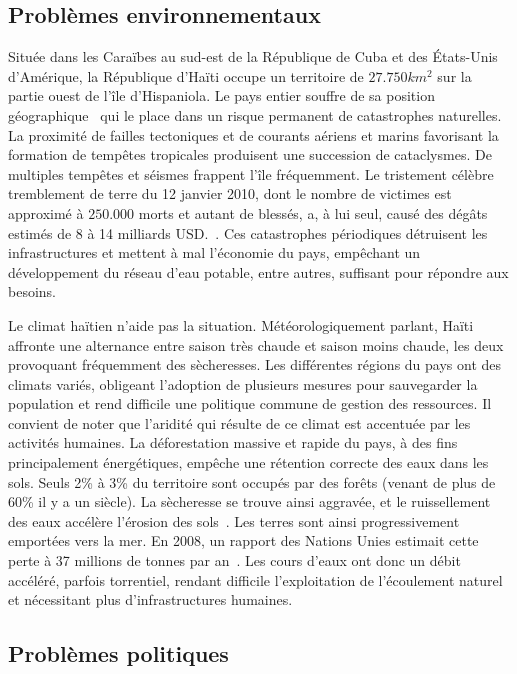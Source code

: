 \documentclass{eplmastersthesis_FR}
\begin{document}
			\subsection*{Problèmes environnementaux}
				Située dans les Caraïbes au sud-est de la République de Cuba et des \'Etats-Unis d'Amérique, la République d'Haïti occupe un territoire de $27.750km^{2}$ sur la partie ouest de l'île d'Hispaniola. Le pays entier souffre de sa position géographique~\cite{ref:regards_situation_eau_haiti} qui le place dans un risque permanent de catastrophes naturelles. La proximité de failles tectoniques et de courants aériens et marins favorisant la formation de tempêtes tropicales produisent une succession de cataclysmes. De multiples tempêtes et séismes frappent l'île fréquemment. Le tristement célèbre tremblement de terre du 12 janvier 2010, dont le nombre de victimes est approximé à $250.000$ morts et autant de blessés, a, à lui seul, causé des dégâts estimés de 8 à 14 milliards USD.~\cite{ref:estimating_economic_damage_earthquake_haiti}. Ces catastrophes périodiques détruisent les infrastructures et mettent à mal l'économie du pays, empêchant un développement du réseau d'eau potable, entre autres, suffisant pour répondre aux besoins.

				Le climat haïtien n'aide pas la situation. Météorologiquement parlant, Haïti affronte une alternance entre saison très chaude et saison moins chaude, les deux provoquant fréquemment des sècheresses. Les différentes régions du pays ont des climats variés, obligeant l'adoption de plusieurs mesures pour sauvegarder la population et rend difficile une politique commune de gestion des ressources. Il convient de noter que l'aridité qui résulte de ce climat est accentuée par les activités humaines. La déforestation massive et rapide du pays, à des fins principalement énergétiques, empêche une rétention correcte des eaux dans les sols. Seuls 2\% à 3\% du territoire sont occupés par des forêts (venant de plus de 60\% il y a un siècle). La sècheresse se trouve ainsi aggravée, et le ruissellement des eaux accélère l'érosion des sols~\cite{ref:desertification_of_haiti}. Les terres sont ainsi progressivement emportées vers la mer. En 2008, un rapport des Nations Unies estimait cette perte à 37 millions de tonnes par an~\cite{ref:impact_degradation_terre}. Les cours d'eaux ont donc un débit accéléré, parfois torrentiel, rendant difficile l'exploitation de l'écoulement naturel et nécessitant plus d'infrastructures humaines.

			\subsection*{Problèmes politiques}
\end{document}
